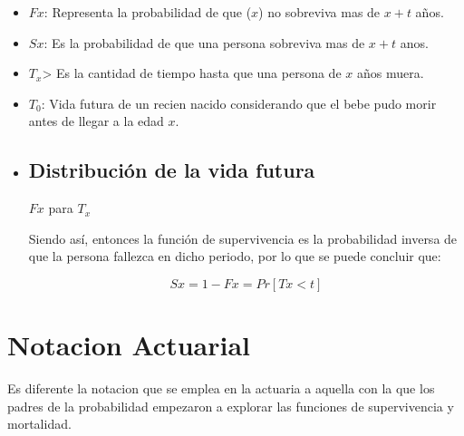 \documentclass[12pt, a4paper, footinclude=true]{scrbook}
\begin{document}
\begin{itemize}

\item $Fx$: Representa la probabilidad de que ($x$) no sobreviva mas de $x + t$ años. 
\item $Sx$: Es la probabilidad de que una persona sobreviva mas de $x+t$ anos. 
\item $T_x$> Es la cantidad de tiempo hasta que una persona de $x$ años muera. 
\item $T_0$: Vida futura de un recien nacido considerando que el bebe pudo morir antes de llegar a la edad $x$. 
\item 

\subsection{Distribución de la vida futura}

\begin{flushright} $Fx$ para $T_x$ 


\end{flushright}



Siendo así, entonces la función de supervivencia es la probabilidad inversa de que la persona fallezca en dicho periodo, por lo que se puede concluir que: 

$$Sx = 1 - Fx = Pr[Tx < t]$$

\end{itemize}

\section{Notacion Actuarial}

Es diferente la notacion que se emplea en la actuaria a aquella con la que los padres de la probabilidad empezaron a explorar las funciones de supervivencia y mortalidad. 
\end{document}
